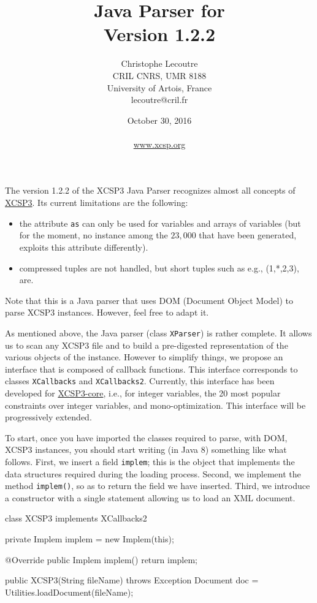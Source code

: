 \documentclass[10pt]{article}
\title{\textcolor{dred}{Java Parser for \xt}\\ \textcolor{dred}{Version 1.2.2}}
\author{Christophe Lecoutre \\
CRIL CNRS, UMR 8188\\ University of Artois, France \\
lecoutre@cril.fr
}
\date{October 30, 2016\\~ \\\href{www.xcsp.org}{www.xcsp.org}}
\renewcommand\logowidth{15pt}
\newcommand\bcroue{\texttt{[image: figures/roue.png]}}
\newcounter{cntEx}
\newcommand{\core}[1]{ 
  \medskip \begin{tcolorbox}[
    enhanced,breakable,
    boxsep=0pt,top=0pt,bottom=0pt,left=8mm,right=1mm,
    toprule=0.1mm,leftrule=0.1mm,rightrule=0.25mm,bottomrule=0.25mm,shadow={0.2mm}{-0.2mm}{0mm}{dgray},
    overlay unbroken and first={\node (logo) at ([xshift=4mm,yshift=-5mm]frame.north west) {}; \draw[black,line width=1.5pt] ([xshift=4mm,yshift=-2.0mm]frame.north west) -- ([xshift=4mm,yshift=1.5mm]frame.south west);  },
    colframe=dgray,titlerule=-0.2mm,toptitle=3mm,coltitle=black,fonttitle=\bfseries,
    lines before break=6, pad at break*=10pt
}
\newenvironment{boxabsc}
    {\stepcounter{cntEx} \core{\bcroue} ,colback=colorex,title style={color=colorex}]} %
    {\end{tcolorbox}} %
\def\xt{{\rm XCSP3}\xspace}
\newcommand{\att}[1]{{\tt #1}} %
\newcommand{\nn}[1]{{\tt #1}} %
\begin{document}
\maketitle


The version 1.2.2 of the \xt Java Parser recognizes almost all concepts of \href{http://xcsp.org/format3.pdf}{\xt}.
Its current limitations are the following:
\begin{itemize}
\item the attribute \att{as} can only be used for variables and arrays of variables (but for the moment, no instance among the $23,000$ that have been generated, exploits this attribute differently).
\item compressed tuples are not handled, but short tuples such as e.g., (1,*,2,3), are.
\end{itemize}


\bigskip
Note that this is a Java parser that uses DOM (Document Object Model) to parse XCSP3 instances.
However, feel free to adapt it. %

\bigskip
As mentioned above, the Java parser (class \nn{XParser}) is rather complete.
It allows us to scan any XCSP3 file and to build a pre-digested representation of the various objects of the instance.
However to simplify things, we propose an interface that is composed of callback functions.
This interface corresponds to classes  \nn{XCallbacks} and \nn{XCallbacks2}.
Currently, this interface has been developed for \href{http://xcsp.org/specifications}{XCSP3-core}, i.e., for integer variables, the 20 most popular constraints over integer variables, and mono-optimization.
This interface will be progressively extended.

\bigskip
To start, once you have imported the classes required to parse, with DOM, \xt instances, 
you should start writing (in Java 8) something like what follows.
First, we insert a field \nn{implem}; this is the object that implements the data structures required during the loading process.
Second, we implement the method \nn{implem()}, so as to return the field we have inserted.
Third, we introduce a constructor with a single statement allowing us to load an XML document. 

\begin{boxabsc}
\begin{absc}
class XCSP3 implements XCallbacks2 { 

  private Implem implem = new Implem(this);

  @Override
  public Implem implem() {
    return implem;
  }

  public XCSP3(String fileName) throws Exception {
    Document doc = Utilities.loadDocument(fileName);
  }
}  
\end{absc} 
\end{boxabsc}
\end{document}
